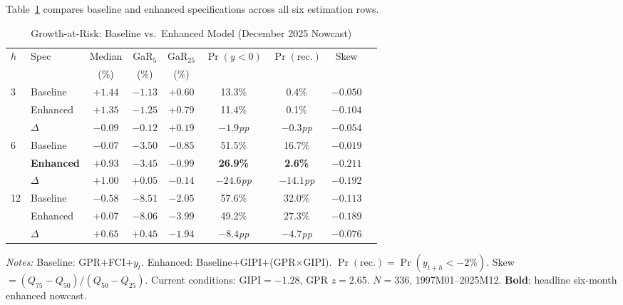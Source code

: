 \documentclass[12pt]{article}
\begin{document}
Table~\ref{tab:garfull} compares baseline and enhanced specifications
across all six estimation rows.

\begin{table}[htbp]\begin{center}
\caption{Growth-at-Risk: Baseline vs.\ Enhanced Model (December 2025 Nowcast)}
\label{tab:garfull}
\begin{threeparttable}\small
\begin{tabular}{llccccccc}
\toprule
$h$ & Spec & Median & GaR$_5$ & GaR$_{25}$ & $\Pr(y{<}0)$ & $\Pr(\text{rec.})$ & Skew\\
&& (\%) & (\%) & (\%) & & &\\
\midrule
\multirow{3}{*}{3}
& Baseline & $+1.44$ & $-1.13$ & $+0.60$ & 13.3\% & 0.4\% & $-0.050$\\
& Enhanced & $+1.35$ & $-1.25$ & $+0.79$ & 11.4\% & 0.1\% & $-0.104$\\
& \textit{$\Delta$} & \textit{$-0.09$} & \textit{$-0.12$} & \textit{$+0.19$} &
  \textit{$-1.9$pp} & \textit{$-0.3$pp} & \textit{$-0.054$}\\
\midrule
\multirow{3}{*}{6}
& Baseline & $-0.07$ & $-3.50$ & $-0.85$ & 51.5\% & 16.7\% & $-0.019$\\
& \textbf{Enhanced} & $\mathbf{+0.93}$ & $-3.45$ & $-0.99$ & \textbf{26.9\%} &
  \textbf{2.6\%} & $-0.211$\\
& \textit{$\Delta$} & \textit{$+1.00$} & \textit{$+0.05$} & \textit{$-0.14$} &
  \textit{$-24.6$pp} & \textit{$-14.1$pp} & \textit{$-0.192$}\\
\midrule
\multirow{3}{*}{12}
& Baseline & $-0.58$ & $-8.51$ & $-2.05$ & 57.6\% & 32.0\% & $-0.113$\\
& Enhanced & $+0.07$ & $-8.06$ & $-3.99$ & 49.2\% & 27.3\% & $-0.189$\\
& \textit{$\Delta$} & \textit{$+0.65$} & \textit{$+0.45$} & \textit{$-1.94$} &
  \textit{$-8.4$pp} & \textit{$-4.7$pp} & \textit{$-0.076$}\\
\bottomrule
\end{tabular}
\begin{tablenotes}[flushleft]\footnotesize
\item \textit{Notes:}
Baseline: GPR$+$FCI$+y_t$.
Enhanced: Baseline$+$GIPI$+$(GPR$\times$GIPI).
$\Pr(\text{rec.}) = \Pr(y_{t+h}<-2\%)$.
Skew $=(Q_{75}-Q_{50})/(Q_{50}-Q_{25})$.
Current conditions: GIPI$=-1.28$, GPR $z=2.65$.
$N=336$, 1997M01--2025M12.
\textbf{Bold}: headline six-month enhanced nowcast.
\end{tablenotes}
\end{threeparttable}
\end{center}\end{table}
\end{document}
